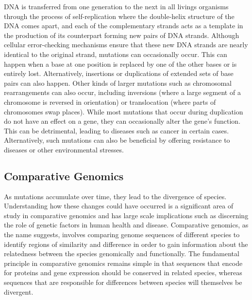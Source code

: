 DNA is transferred from one generation to the next in all livings organisms through the process of self-replication where the double-helix structure of the DNA comes apart, and each of the complementary strands acts as a template in the production of its counterpart forming new pairs of DNA strands\cite{pray2008semi}. Although cellular error-checking mechanisms ensure that these new DNA strands are nearly identical to the original strand, mutations can occasionally occur. This can happen when a base at one position is replaced by one of the other bases or is entirely lost. Alternatively, insertions or duplications of extended sets of base pairs can also happen. Other kinds of larger mutations such as chromosomal rearrangements can also occur, including inversions (where a large segment of a chromosome is reversed in orientation) or translocation (where parts of chromosomes swap places)\cite{hartwell2008genetics}. While most mutations that occur during duplication do not have an effect on a gene, they can occasionally alter the gene's function. This can be detrimental, leading to diseases such as cancer in certain cases. Alternatively, such mutations can also be beneficial by offering resistance to diseases or other environmental stresses. 

\subsection{Comparative Genomics}\label{comparegenomics}

As mutations accumulate over time, they lead to the divergence of species. Understanding how these changes could have occurred is a significant area of study in comparative genomics and has large scale implications such as discerning the role of genetic factors in human health and disease\cite{collins2003vision}. Comparative genomics, as the name suggests, involves comparing genome sequences of different species to identify regions of similarity and difference in order to gain information about the relatedness between the species genomically and functionally. The fundamental principle in comparative genomics remains simple in that sequences that encode for proteins and gene expression should be conserved in related species, whereas sequences that are responsible for differences between species will themselves be divergent\cite{hardison2003comparative}.

